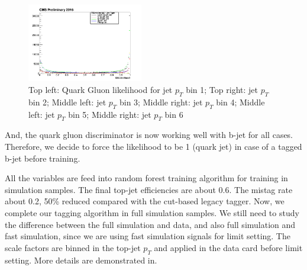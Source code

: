 \begin{figure}[htbp]
\begin{center}
  \includegraphics[width=0.45\textwidth]{sections/mc4/TopTagger/figures/_b_qglikelihoodjetptbin5_.png}
 \end{center}
 \caption{Top left: Quark Gluon likelihood for jet $p_{T}$ bin 1; Top right: jet $p_{T}$ bin 2; Middle left: jet $p_{T}$ bin 3; Middle right: jet $p_{T}$ bin 4; Middle left: jet $p_{T}$ bin 5; Middle right: jet $p_{T}$ bin 6}
 \label{fig:c4ttqgljetpt}
\end{figure}

And, the quark gluon discriminator is now working well with b-jet for all cases. Therefore, we decide to force the likelihood to be 1 (quark jet) in case of a tagged b-jet before training. 

All the variables are feed into random forest\cite{Ho:1995:RDF:844379.844681} training algorithm for training in simulation samples. The final top-jet efficiencies are about 0.6. The mistag rate about 0.2, 50\% reduced compared with the cut-based legacy tagger. Now, we complete our tagging algorithm in full simulation samples. We still need to study the difference between the full simulation and data, and also full simulation and fast simulation, since we are using fast simulation signals for limit setting. The scale factors are binned in the top-jet $p_{T}$ and applied in the data card before limit setting. More details are demonstrated in\cite{AN-16-461}. 

